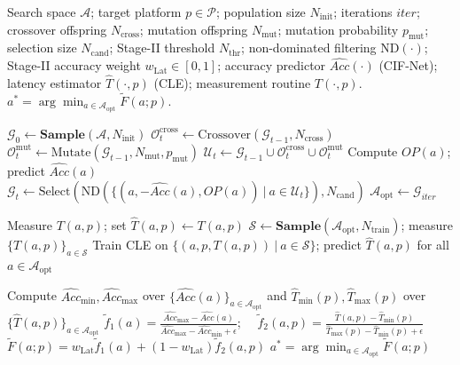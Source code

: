 \documentclass[preprint,review,12p,times]{elsarticle}
\begin{document}
\begin{algorithm}
\caption{\linespread{1.0}\selectfont
Chain-Structured Binary Neural Architecture Search for Efficient Visual Recognition across Platforms}
\label{alg:flashnas}
\small
\setlength{\baselineskip}{10pt}
\begin{algorithmic}[1]
\renewcommand{\algorithmicrequire}{\textbf{Input:}}
\renewcommand{\algorithmicensure}{\textbf{Output:}}

\Require Search space $\mathcal{A}$; target platform $p\in\mathcal{P}$; population size $N_{\text{init}}$; iterations $iter$;
crossover offspring $N_{\text{cross}}$; mutation offspring $N_{\text{mut}}$; mutation probability $p_{\text{mut}}$; selection size $N_{\text{cand}}$;
Stage-II threshold $N_{\text{thr}}$;
non-dominated filtering $\mathrm{ND(\cdot)}$;
Stage-II accuracy weight $w_{\mathrm{Lat}}\in[0,1]$;
accuracy predictor $\widehat{Acc}(\cdot)$ (CIF-Net); latency estimator $\hat{T}(\cdot,p)$ (CLE); measurement routine $T(\cdot,p)$.
\Ensure $a^*=\arg\min_{a\in\mathcal{A}_{\text{opt}}}\tilde{F}(a;p)$.

\State $\mathcal{G}_0 \gets \textbf{Sample}(\mathcal{A},N_{\text{init}})$
  \State $\mathcal{O}^{\mathrm{cross}}_t\gets\mathrm{Crossover}(\mathcal{G}_{t-1},N_{\text{cross}})$
  \State $\mathcal{O}^{\mathrm{mut}}_t\gets\mathrm{Mutate}(\mathcal{G}_{t-1},N_{\text{mut}},p_{\text{mut}})$
  \State $\mathcal{U}_t\gets\mathcal{G}_{t-1}\cup\mathcal{O}^{\mathrm{cross}}_t\cup\mathcal{O}^{\mathrm{mut}}_t$
   \State Compute $OP(a)$; predict $\widehat{Acc}(a)$ \EndFor
  \State $\mathcal{G}_t \gets \mathrm{Select}\!\left(\mathrm{ND}\!\left(\{(a,-\widehat{Acc}(a),OP(a))~|~a\in\mathcal{U}_t\}\right),N_{\text{cand}}\right)$
\EndFor
\State $\mathcal{A}_{\text{opt}}\gets\mathcal{G}_{iter}$ 

   \State Measure $T(a,p)$; set $\hat{T}(a,p)\leftarrow T(a,p)$ \EndFor
\Else
  \State $\mathcal{S}\gets\textbf{Sample}(\mathcal{A}_{\text{opt}},N_{\text{train}})$; measure $\{T(a,p)\}_{a\in\mathcal{S}}$
  \State Train CLE on $\{(a,p,T(a,p))~|~a\in\mathcal{S}\}$; predict $\hat{T}(a,p)$ for all $a\in\mathcal{A}_{\text{opt}}$
\EndIf

\State Compute $\widehat{Acc}_{\min},\widehat{Acc}_{\max}$ over $\{\widehat{Acc}(a)\}_{a\in\mathcal{A}_{\text{opt}}}$ and $\hat{T}_{\min}(p),\hat{T}_{\max}(p)$ over $\{\hat{T}(a,p)\}_{a\in\mathcal{A}_{\text{opt}}}$
  \State $\tilde{f}_1(a)=\frac{\widehat{Acc}_{\max}-\widehat{Acc}(a)}{\widehat{Acc}_{\max}-\widehat{Acc}_{\min}+\epsilon}$;~~
         $\tilde{f}_2(a,p)=\frac{\hat{T}(a,p)-\hat{T}_{\min}(p)}{\hat{T}_{\max}(p)-\hat{T}_{\min}(p)+\epsilon}$
  \State $\tilde{F}(a;p)=w_{\mathrm{Lat}}\tilde{f}_1(a)+(1-w_{\mathrm{Lat}})\tilde{f}_2(a,p)$
\EndFor
\State \Return $a^*=\arg\min_{a\in\mathcal{A}_{\text{opt}}}\tilde{F}(a;p)$
\end{algorithmic}
\end{algorithm}
\end{document}
